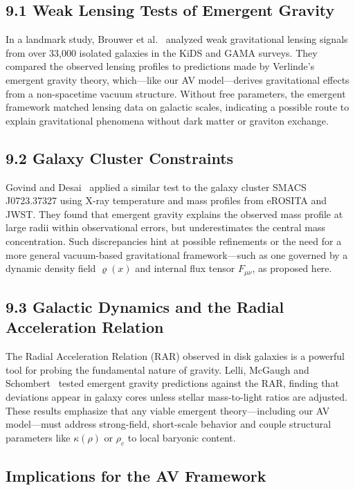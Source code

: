 \documentclass[twoside]{article}
\theoremstyle{definition}
\theoremstyle{remark}
\numberwithin{equation}{section}
\theoremstyle{definition}
\theoremstyle{example}
\theoremstyle{remark}
\numberwithin{equation}{section}%
\begin{document}
\subsection*{9.1 Weak Lensing Tests of Emergent Gravity}

In a landmark study, Brouwer et al.~\cite{Brouwer2016} analyzed weak gravitational lensing signals from over 33,000 isolated galaxies in the KiDS and GAMA surveys. They compared the observed lensing profiles to predictions made by Verlinde’s emergent gravity theory, which—like our AV model—derives gravitational effects from a non-spacetime vacuum structure. Without free parameters, the emergent framework matched lensing data on galactic scales, indicating a possible route to explain gravitational phenomena without dark matter or graviton exchange.

\subsection*{9.2 Galaxy Cluster Constraints}

Govind and Desai~\cite{Govind2024} applied a similar test to the galaxy cluster SMACS J0723.37327 using X-ray temperature and mass profiles from eROSITA and JWST. They found that emergent gravity explains the observed mass profile at large radii within observational errors, but underestimates the central mass concentration. Such discrepancies hint at possible refinements or the need for a more general vacuum-based gravitational framework—such as one governed by a dynamic density field \( \varrho(x) \) and internal flux tensor \( F_{\mu\nu} \), as proposed here.

\subsection*{9.3 Galactic Dynamics and the Radial Acceleration Relation}

The Radial Acceleration Relation (RAR) observed in disk galaxies is a powerful tool for probing the fundamental nature of gravity. Lelli, McGaugh and Schombert~\cite{Lelli2017} tested emergent gravity predictions against the RAR, finding that deviations appear in galaxy cores unless stellar mass-to-light ratios are adjusted. These results emphasize that any viable emergent theory—including our AV model—must address strong-field, short-scale behavior and couple structural parameters like \( \kappa(\rho) \) or \( \rho_c \) to local baryonic content.

\subsection*{Implications for the AV Framework}
\end{document}
